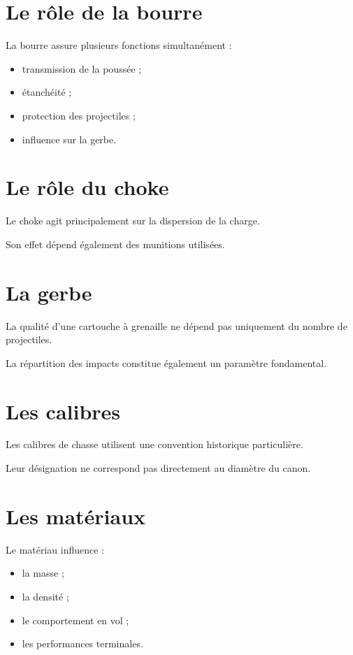 \section{Le rôle de la bourre}

La bourre assure plusieurs fonctions simultanément :

\begin{itemize}
    \item transmission de la poussée ;
    \item étanchéité ;
    \item protection des projectiles ;
    \item influence sur la gerbe.
\end{itemize}

\section{Le rôle du choke}

Le choke agit principalement sur la dispersion de la charge.

Son effet dépend également des munitions utilisées.

\section{La gerbe}

La qualité d'une cartouche à grenaille ne dépend pas uniquement du nombre de
projectiles.

La répartition des impacts constitue également un paramètre fondamental.

\section{Les calibres}

Les calibres de chasse utilisent une convention historique particulière.

Leur désignation ne correspond pas directement au diamètre du canon.

\section{Les matériaux}

Le matériau influence :

\begin{itemize}
    \item la masse ;
    \item la densité ;
    \item le comportement en vol ;
    \item les performances terminales.
\end{itemize}

